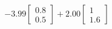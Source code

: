 \documentclass[preview]{standalone}
\begin{document}
\begin{align*}
-3.99 \begin{bmatrix} 0.8 \\ 0.5 \end{bmatrix} + 2.00 \begin{bmatrix} 1 \\ 1.6 \end{bmatrix}
\end{align*}
\end{document}
